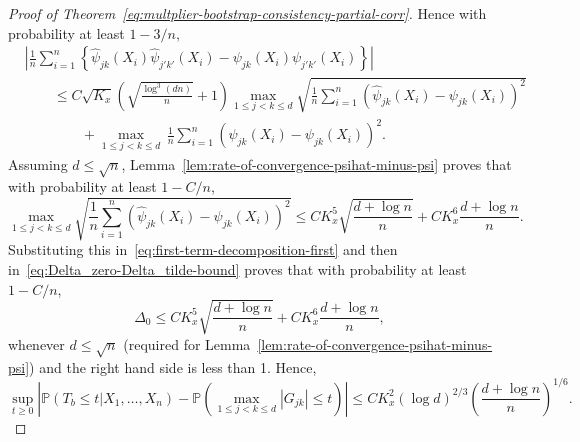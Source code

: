 \documentclass[11pt]{article}
\begin{document}
\begin{appendices}
\begin{proof}[Proof of Theorem~\ref{eq:multplier-bootstrap-consistency-partial-corr}]
Hence with probability at least $1 - 3/n,$
\begin{equation}\label{eq:first-term-decomposition-first}
\begin{split}
&\left|\frac{1}{n}\sum_{i=1}^n \left\{\widehat{\psi}_{jk}(X_i)\widehat{\psi}_{j'k'}(X_i) - \psi_{jk}(X_i)\psi_{j'k'}(X_i)\right\}\right|\\ &\qquad\le C\sqrt{K_x}\left(\sqrt{\frac{\log^3(dn)}{n}} + 1\right)\max_{1\le j < k\le d}\sqrt{\frac{1}{n}\sum_{i=1}^n \left(\widehat{\psi}_{jk}(X_i) - \psi_{jk}(X_i)\right)^2}\\
&\qquad\qquad+ \max_{1\le j < k\le d}\,{\frac{1}{n}\sum_{i=1}^n \left(\widehat{\psi}_{jk}(X_i) - \psi_{jk}(X_i)\right)^2}.
\end{split}
\end{equation}
Assuming $d \le \sqrt{n}$, Lemma~\ref{lem:rate-of-convergence-psihat-minus-psi} proves that with probability at least $1 - C/n$,
\[
\max_{1\le j < k\le d}\sqrt{\frac{1}{n}\sum_{i=1}^n \left(\widehat{\psi}_{jk}(X_i) - \psi_{jk}(X_i)\right)^2} \le CK_x^5\sqrt{\frac{d + \log n}{n}} + CK_x^6\frac{d + \log n}{n}.
\]
Substituting this in~\eqref{eq:first-term-decomposition-first} and then in~\eqref{eq:Delta_zero-Delta_tilde-bound} proves that with probability at least $1 - C/n$,
\[
\Delta_0 \le CK_x^5\sqrt{\frac{d + \log n}{n}} + CK_x^6\frac{d + \log n}{n},
\]
whenever  $d \le \sqrt{n}$ (required for Lemma~\ref{lem:rate-of-convergence-psihat-minus-psi}) and the right hand side is less than 1. Hence,
\[
\sup_{t\ge0}\left|\mathbb{P}(T_b \le t|X_1,\ldots,X_n) - \mathbb{P}\left(\max_{1\le j < k\le d}|G_{jk}| \le t\right)\right| \le CK_x^{2}(\log d)^{2/3}\left(\frac{d + \log n}{n}\right)^{1/6}.
\]
\end{proof}



\end{appendices}
\end{document}
